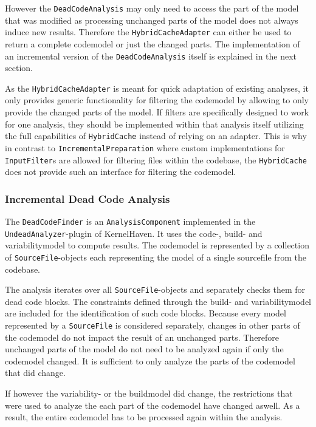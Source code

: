 \documentclass[a4paper]{article}
\begin{document}
However the \texttt{DeadCodeAnalysis} may only need to access the part of the model that was modified as processing unchanged parts of the model does not always induce new results. Therefore the \texttt{HybridCacheAdapter} can either be used to return a complete codemodel or just the changed parts. The implementation of an incremental version of the \texttt{DeadCodeAnalysis} itself is explained in the next section.

As the \texttt{HybridCacheAdapter} is meant for quick adaptation of existing analyses, it only provides generic functionality for filtering the codemodel by allowing to only provide the changed parts of the model. If filters are specifically designed to work for one analysis, they should be implemented within that analysis itself utilizing the full capabilities of \texttt{HybridCache} instead of relying on an adapter. This is why in contrast to \texttt{IncrementalPreparation} where custom implementations for \texttt{InputFilter}s are allowed for filtering files within the codebase, the \texttt{HybridCache} does not provide such an interface for filtering the codemodel.

\subsubsection{Incremental Dead Code Analysis} \label{incremental-dead-code-analysis}

The \texttt{DeadCodeFinder} is an \texttt{AnalysisComponent} implemented in the \texttt{UndeadAnalyzer}-plugin of KernelHaven. It uses the code-, build- and variabilitymodel to compute results. The codemodel is represented by a collection of \texttt{SourceFile}-objects each representing the model of a single sourcefile from the codebase.

The analysis iterates over all \texttt{SourceFile}-objects and separately checks them for dead code blocks. The constraints defined through the build- and variabilitymodel are included for the identification of such code blocks. Because every model represented by a \texttt{SourceFile} is considered separately, changes in other parts of the codemodel do not impact the result of an unchanged parts. Therefore unchanged parts of the model do not need to be analyzed again if only the codemodel changed. It is sufficient to only analyze the parts of the codemodel that did change.

If however the variability- or the buildmodel did change, the restrictions that were used to analyze the each part of the codemodel have changed aswell. As a result, the entire codemodel has to be processed again within the analysis.
\end{document}
